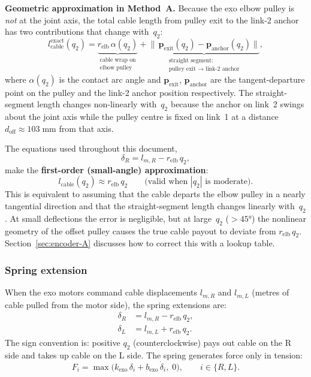 \documentclass[11pt, a4paper]{article}
\begin{document}
\begin{mdframed}
\textbf{Geometric approximation in Method~A.}
Because the exo elbow pulley is \emph{not} at the joint axis, the total
cable length from pulley exit to the link-2 anchor has two contributions
that change with~$q_2$:
%
\begin{equation}\label{eq:cable-A-exact}
    l_{\text{cable}}^{\text{exact}}(q_2)
    = \underbrace{r_{\text{elb}}\,\alpha(q_2)}_{\substack{\text{cable wrap on}\\\text{elbow pulley}}}
    + \underbrace{\bigl\lVert\,\bm{p}_{\text{exit}}(q_2) - \bm{p}_{\text{anchor}}(q_2)\bigr\rVert}_{\substack{\text{straight segment:}\\\text{pulley exit } \to \text{ link-2 anchor}}},
\end{equation}
%
where $\alpha(q_2)$ is the contact arc angle and $\bm{p}_{\text{exit}}$,
$\bm{p}_{\text{anchor}}$ are the tangent-departure point on the pulley and
the link-2 anchor position respectively.  The straight-segment length
changes non-linearly with~$q_2$ because the anchor on link~2 swings about
the joint axis while the pulley centre is fixed on link~1 at a distance
$d_{\text{off}} \approx 103\;\text{mm}$ from that axis.

\medskip\noindent
The equations used throughout this document,
\[
    \delta_R = l_{m,R} - r_{\text{elb}}\,q_2,
\]
make the \textbf{first-order (small-angle) approximation}:
%
\begin{equation}\label{eq:approx-A}
    l_{\text{cable}}(q_2) \approx r_{\text{elb}}\,q_2
    \qquad\text{(valid when }|q_2|\text{ is moderate).}
\end{equation}
%
This is equivalent to assuming that the cable departs the elbow pulley in a
nearly tangential direction and that the straight-segment length changes
linearly with~$q_2$.  At small deflections the error is negligible, but at
large~$q_2$ ($>45°$) the nonlinear geometry of the offset pulley causes the
true cable payout to deviate from $r_{\text{elb}}\,q_2$.  Section~\ref{sec:encoder-A}
discusses how to correct this with a lookup table.
\end{mdframed}

\subsubsection{Spring extension}

When the exo motors command cable displacements $l_{m,R}$ and $l_{m,L}$
(metres of cable pulled from the motor side), the spring extensions are:
%
\begin{align}\label{eq:delta_A}
    \delta_R &= l_{m,R} - r_{\text{elb}}\, q_2, \\
    \delta_L &= l_{m,L} + r_{\text{elb}}\, q_2.
\end{align}
%
The sign convention is: positive $q_2$ (counterclockwise) pays out cable on
the R side and takes up cable on the L side.  The spring generates force only
in tension:
%
\begin{equation}\label{eq:F_spring_A}
    F_i = \max\!\bigl(k_{\text{exo}}\,\delta_i + b_{\text{exo}}\,\dot{\delta}_i,\; 0\bigr),
    \qquad i \in \{R, L\}.
\end{equation}
\end{document}
